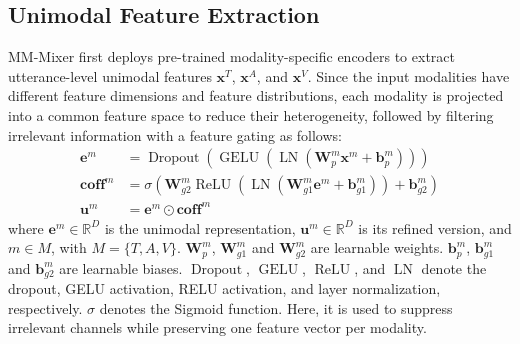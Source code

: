 \documentclass[letterpaper]{article} %
\begin{document}



\subsection{Unimodal Feature Extraction}
MM-Mixer first deploys pre-trained modality-specific encoders to extract utterance-level unimodal features $\mathbf{x}^{T}$, $\mathbf{x}^{A}$, and $\mathbf{x}^{V}$. Since the input modalities have different feature dimensions and feature
distributions, each modality is projected into a common feature space to reduce their heterogeneity, followed by filtering irrelevant information with a feature gating as follows:
\begin{equation}
\begin{aligned}
\mathbf{e}^{m}
&=\operatorname{Dropout}\!\left(
  \operatorname{GELU}\!\left(
  \operatorname{LN}(\mathbf{W}_{p}^{m}\mathbf{x}^{m}
  +\mathbf{b}_{p}^{m})\right)\right) \\
\mathbf{coff}^{m} &= \sigma\!\left(\mathbf{W}_{g2}^{m}
  \operatorname{ReLU}\!\left(
  \operatorname{LN}(\mathbf{W}_{g1}^{m}\mathbf{e}^{m}
  +\mathbf{b}_{g1}^{m})\right)+\mathbf{b}_{g2}^{m}\right) \\
\mathbf{u}^{m} & =\mathbf{e}^{m}\odot \mathbf{coff}^{m}
\end{aligned}
\label{eq:feature_gating}
\end{equation}
where $\mathbf{e}^{m}\in\mathbb{R}^{D}$ is the unimodal representation, $\mathbf{u}^{m}\in\mathbb{R}^{D}$ is its refined version, and $m\in M$, with $M=\{T,A,V\}$. $\mathbf{W}_{p}^{m}$, $\mathbf{W}_{g1}^{m}$ and $\mathbf{W}_{g2}^{m}$ are learnable weights. $\mathbf{b}_{p}^{m}$, $\mathbf{b}_{g1}^{m}$ and $\mathbf{b}_{g2}^{m}$ are learnable biases. $\operatorname{Dropout}$, $\operatorname{GELU}$, $\operatorname{ReLU}$, and $\operatorname{LN}$ denote the dropout, GELU activation, RELU activation, and layer normalization, respectively. $\sigma$ denotes the Sigmoid function. Here, it is used to suppress irrelevant channels while preserving one feature vector per modality.

\end{document}

